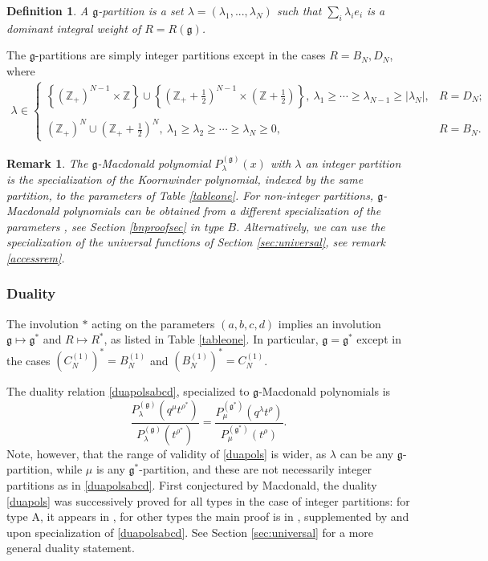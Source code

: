 \documentclass[12pt]{amsart}
\newtheorem{defn}[thm]{Definition}
\newtheorem{remark}[thm]{Remark}
\newcommand{\g}{{\mathfrak{g}}}
\newcommand{\Z}{{\mathbb Z}}
\numberwithin{equation}{section}
\begin{document}
\begin{defn}
A $\g$-partition is a set $\lambda=(\lambda_1,...,\lambda_N)$ such that $\sum_i \lambda_i e_i$ is a dominant integral weight of $R=R(\g)$. 
\end{defn}
The $\g$-partitions are simply integer partitions except in the cases $R=B_N, D_N$, where
\begin{eqnarray*}
\lambda\in \left\{\begin{array}{ll}
\left\{(\Z_+)^{N-1}\times \Z \right\}\cup 
\left\{(\Z_+\!\!+\!\!{\scriptstyle\frac{1}{2}})^{N-1}\times (\Z+\!\!{\scriptstyle\frac{1}{2}})\right\},\  
\lambda_1\geq \cdots \geq \lambda_{N-1}\geq |\lambda_N|,& R=D_N;\\ \\
(\Z_+)^N \cup (\Z_+\!\!+\!\!{\scriptstyle\frac{1}{2}})^{N},\ 
\lambda_1\geq \lambda_2\geq \cdots \geq \lambda_N\geq 0,& R=B_N.
\end{array}\right.
\end{eqnarray*}

 \begin{remark}
The $\g$-Macdonald polynomial $P_\lambda^{(\g)}(x)$ with $\lambda$ an integer partition is the specialization of the Koornwinder polynomial, indexed by the same partition, to the parameters of Table \ref{tableone}. 
%
%
%
%
%
%
%
%
%
%
%
%
%
%
%
%
For non-integer partitions, $\g$-Macdonald polynomials can be obtained from a different specialization of the parameters \cite{vandiej}, see Section \ref{bnproofsec} in type $B$. Alternatively, we can use the specialization of the
universal functions of Section \ref{sec:universal}, see remark \ref{accessrem}.
\end{remark}

\subsubsection{Duality}
\label{sec:duag}
The involution $*$ acting on the parameters $(a,b,c,d)$ implies an involution $\g\mapsto \g^*$ and $R\mapsto R^*$, as listed in Table \ref{tableone}. In particular, $\g=\g^*$ except in the cases $ (C_N^{(1)})^*= B_{N}^{(1)}$ and $(B_N^{(1)})^*= C_{N}^{(1)}$.
%
%
%
%
%
%
%
%
%
%

The duality relation \eqref{duapolsabcd}, specialized to $\g$-Macdonald polynomials is
\begin{equation}\label{duapols}
\frac{P_\lambda^{(\g)}(q^\mu t^{\rho^*})}{P^{(\g)}_\lambda(t^{\rho^*})}=\frac{P^{(\g^*)}_\mu(q^\lambda t^{\rho})}
{P^{(\g^*)}_{\mu}(t^{\rho})}.
\end{equation}
Note, however, that the range of validity of \eqref{duapols} is wider, as $\lambda$ can be any $\g$-partition, 
while $\mu$ is any $\g^*$-partition, and these are not necessarily integer partitions as in \eqref{duapolsabcd}.
First conjectured by Macdonald, the duality \eqref{duapols} was successively proved for all types in the case of integer partitions: 
for type A, it appears in \cite{macdo}, for other types the main proof is in \cite{Cherednik95}, 
supplemented by \cite{vDselfdual} and \cite{Sahi} upon specialization of \eqref{duapolsabcd}. See  Section \ref{sec:universal} for a more general duality statement.
\end{document}
